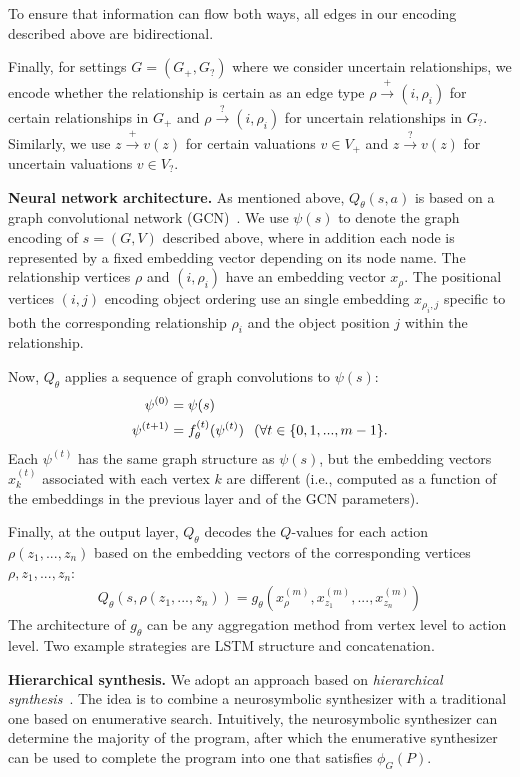 To ensure that information can flow both ways, all edges in our encoding described above are bidirectional.

Finally, for settings $G=(G_+,G_?)$ where we consider uncertain relationships, we encode whether the relationship is certain as an edge type $\rho\xrightarrow{+}(i,\rho_i)$ for certain relationships in $G_+$ and $\rho\xrightarrow{?}(i,\rho_i)$ for uncertain relationships in $G_?$. Similarly, we use $z\xrightarrow{+}v(z)$ for certain valuations $v\in V_+$ and $z\xrightarrow{?}v(z)$ for uncertain valuations $v\in V_?$.

\textbf{Neural network architecture.}
%
As mentioned above, $Q_{\theta}(s,a)$ is based on a graph convolutional network (GCN)~\cite{kipf2016semi}. We use $\psi(s)$ to denote the graph encoding of $s=(G,V)$ described above, where in addition each node is represented by a fixed embedding vector depending on its node name. The relationship vertices $\rho$ and $(i,\rho_i)$ have an embedding vector $x_{\rho}$. The positional vertices $(i,j)$ encoding object ordering use an single embedding $x_{\rho_i,j}$ specific to both the corresponding relationship $\rho_i$ and the object position $j$ within the relationship.

Now, $Q_{\theta}$ applies a sequence of graph convolutions to $\psi(s)$:
\begin{align*}
\psi^{(0)}&=\psi(s) \\
\psi^{(t+1)}&=f_{\theta}^{(t)}(\psi^{(t)})\hspace{0.1in}(\forall t\in\{0,1,...,m-1\}.
\end{align*}
Each $\psi^{(t)}$ has the same graph structure as $\psi(s)$, but the embedding vectors $x_k^{(t)}$ associated with each vertex $k$ are different (i.e., computed as a function of the embeddings in the previous layer and of the GCN parameters).

Finally, at the output layer, $Q_{\theta}$ decodes the $Q$-values for each action $\rho(z_1,...,z_n)$ based on the embedding vectors of the corresponding vertices $\rho,z_1,...,z_n$:
\begin{align*}
Q_{\theta}(s,\rho(z_1,...,z_n))=g_{\theta}(x_{\rho}^{(m)},x_{z_1}^{(m)},...,x_{z_n}^{(m)})
\end{align*}
The architecture of $g_{\theta}$ can be any aggregation method from vertex level to action level. Two example strategies are LSTM structure and concatenation. 

\textbf{Hierarchical synthesis.}
%
We adopt an approach based on \emph{hierarchical synthesis}~\cite{nye2019learning}. The idea is to combine a neurosymbolic synthesizer with a traditional one based on enumerative search. Intuitively, the neurosymbolic synthesizer can determine the majority of the program, after which the enumerative synthesizer can be used to complete the program into one that satisfies $\phi_G(P)$.

